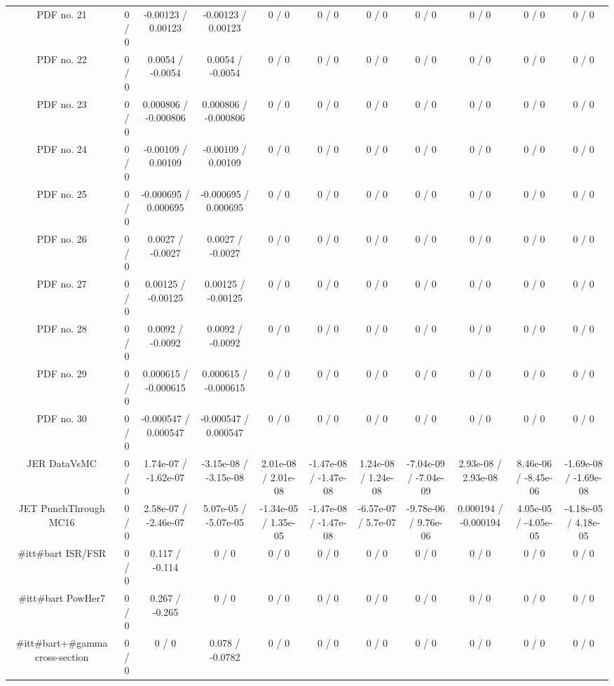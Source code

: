 \begin{table}[htbp]
\begin{center}
\begin{tabular}{|c|c|c|c|c|c|c|c|c|c|c|}
  PDF no. 21 & 0 / 0 & -0.00123 / 0.00123 & -0.00123 / 0.00123 & 0 / 0 & 0 / 0 & 0 / 0 & 0 / 0 & 0 / 0 & 0 / 0 & 0 / 0 \\ 
  PDF no. 22 & 0 / 0 & 0.0054 / -0.0054 & 0.0054 / -0.0054 & 0 / 0 & 0 / 0 & 0 / 0 & 0 / 0 & 0 / 0 & 0 / 0 & 0 / 0 \\ 
  PDF no. 23 & 0 / 0 & 0.000806 / -0.000806 & 0.000806 / -0.000806 & 0 / 0 & 0 / 0 & 0 / 0 & 0 / 0 & 0 / 0 & 0 / 0 & 0 / 0 \\ 
  PDF no. 24 & 0 / 0 & -0.00109 / 0.00109 & -0.00109 / 0.00109 & 0 / 0 & 0 / 0 & 0 / 0 & 0 / 0 & 0 / 0 & 0 / 0 & 0 / 0 \\ 
  PDF no. 25 & 0 / 0 & -0.000695 / 0.000695 & -0.000695 / 0.000695 & 0 / 0 & 0 / 0 & 0 / 0 & 0 / 0 & 0 / 0 & 0 / 0 & 0 / 0 \\ 
  PDF no. 26 & 0 / 0 & 0.0027 / -0.0027 & 0.0027 / -0.0027 & 0 / 0 & 0 / 0 & 0 / 0 & 0 / 0 & 0 / 0 & 0 / 0 & 0 / 0 \\ 
  PDF no. 27 & 0 / 0 & 0.00125 / -0.00125 & 0.00125 / -0.00125 & 0 / 0 & 0 / 0 & 0 / 0 & 0 / 0 & 0 / 0 & 0 / 0 & 0 / 0 \\ 
  PDF no. 28 & 0 / 0 & 0.0092 / -0.0092 & 0.0092 / -0.0092 & 0 / 0 & 0 / 0 & 0 / 0 & 0 / 0 & 0 / 0 & 0 / 0 & 0 / 0 \\ 
  PDF no. 29 & 0 / 0 & 0.000615 / -0.000615 & 0.000615 / -0.000615 & 0 / 0 & 0 / 0 & 0 / 0 & 0 / 0 & 0 / 0 & 0 / 0 & 0 / 0 \\ 
  PDF no. 30 & 0 / 0 & -0.000547 / 0.000547 & -0.000547 / 0.000547 & 0 / 0 & 0 / 0 & 0 / 0 & 0 / 0 & 0 / 0 & 0 / 0 & 0 / 0 \\ 
  JER DataVsMC & 0 / 0 & 1.74e-07 / -1.62e-07 & -3.15e-08 / -3.15e-08 & 2.01e-08 / 2.01e-08 & -1.47e-08 / -1.47e-08 & 1.24e-08 / 1.24e-08 & -7.04e-09 / -7.04e-09 & 2.93e-08 / 2.93e-08 & 8.46e-06 / -8.45e-06 & -1.69e-08 / -1.69e-08 \\ 
  JET PunchThrough MC16 & 0 / 0 & 2.58e-07 / -2.46e-07 & 5.07e-05 / -5.07e-05 & -1.34e-05 / 1.35e-05 & -1.47e-08 / -1.47e-08 & -6.57e-07 / 5.7e-07 & -9.78e-06 / 9.76e-06 & 0.000194 / -0.000194 & 4.05e-05 / -4.05e-05 & -4.18e-05 / 4.18e-05 \\ 
  #it{t#bar{t}} ISR/FSR & 0 / 0 & 0.117 / -0.114 & 0 / 0 & 0 / 0 & 0 / 0 & 0 / 0 & 0 / 0 & 0 / 0 & 0 / 0 & 0 / 0 \\ 
  #it{t#bar{t}} PowHer7 & 0 / 0 & 0.267 / -0.265 & 0 / 0 & 0 / 0 & 0 / 0 & 0 / 0 & 0 / 0 & 0 / 0 & 0 / 0 & 0 / 0 \\ 
  #it{t#bar{t}}+#gamma cross-section & 0 / 0 & 0 / 0 & 0.078 / -0.0782 & 0 / 0 & 0 / 0 & 0 / 0 & 0 / 0 & 0 / 0 & 0 / 0 & 0 / 0 \\ 

\end{tabular}
\end{center}
\end{table}
